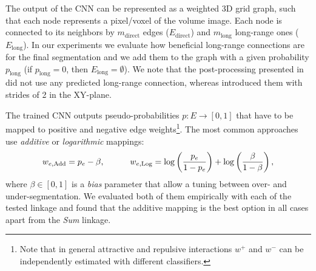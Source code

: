 The output of the CNN can be represented as a weighted 3D grid graph, such that each node represents a pixel/voxel of the volume image. Each node is connected to its neighbors by $m_{\mathrm{direct}}$ edges ($E_{\mathrm{direct}}$) and $m_{\mathrm{long}}$ long-range ones ($E_{\mathrm{long}}$).
In our experiments we evaluate how beneficial long-range connections are for the final segmentation and we add them to the graph with a given probability $p_{\mathrm{long}}$ (if $p_{\mathrm{long}}=0$, then $E_{\mathrm{long}}=\emptyset$).
We note that the post-processing presented in \cite{lee2017superhuman} did not use any predicted long-range connection, whereas \cite{wolf2018mutex} introduced them with strides of 2 in the XY-plane.

The trained CNN outputs pseudo-probabilities $p:E \rightarrow [0,1]$ that have to be mapped to positive and negative edge weights\footnote{Note that in general attractive and repulsive interactions $w^+$ and $w^-$ can be independently estimated with different classifiers.}. The most common approaches use \emph{additive} \cite{ailon2008aggregating} or \emph{logarithmic} \cite{finkel2008enforcing,andres2012globally} mappings:
\begin{equation}
w_{e,\mathrm{Add}} = p_e - \beta, \qquad \quad w_{e,\mathrm{Log}} = \log \left( \frac{p_e}{1-p_e} \right) + \log \left( \frac{\beta}{1-\beta} \right),
\end{equation}
where $\beta \in [0,1]$ is a \emph{bias} parameter that allow a tuning between over- and under-segmentation. We evaluated both of them empirically with each of the tested linkage and found that the additive mapping is the best option in all cases apart from the \emph{Sum} linkage. 
